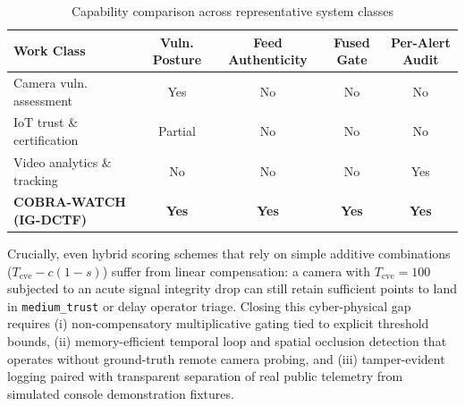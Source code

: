 \begin{table}[!ht]
  \centering
  \caption{Capability comparison across representative system classes}
  \label{tab:lit_gap}
  \begin{tabular}{@{}lcccc@{}}
    \toprule
    \textbf{Work Class} & \textbf{Vuln. Posture} & \textbf{Feed Authenticity} & \textbf{Fused Gate} & \textbf{Per-Alert Audit} \\
    \midrule
    Camera vuln. assessment~\cite{bernot2025cctv,oliver2025ipcam,auti2025vapt} & Yes & No & No & No \\
    IoT trust \& certification~\cite{swami2025sciiot,ferraris2024trust,biot2026trust} & Partial & No & No & No \\
    Video analytics \& tracking~\cite{jocher2023yolov8,zhang2022bytetrack,nayak2019loitering} & No & No & No & Yes \\
    \textbf{COBRA-WATCH (IG-DCTF)} & \textbf{Yes} & \textbf{Yes} & \textbf{Yes} & \textbf{Yes} \\
    \bottomrule
  \end{tabular}
\end{table}

Crucially, even hybrid scoring schemes that rely on simple additive combinations ($T_{\mathrm{cve}} - c(1-s)$) suffer from linear compensation: a camera with $T_{\mathrm{cve}} = 100$ subjected to an acute signal integrity drop can still retain sufficient points to land in \texttt{medium\_trust} or delay operator triage. Closing this cyber-physical gap requires (i) non-compensatory multiplicative gating tied to explicit threshold bounds, (ii) memory-efficient temporal loop and spatial occlusion detection that operates without ground-truth remote camera probing, and (iii) tamper-evident logging paired with transparent separation of real public telemetry from simulated console demonstration fixtures.

